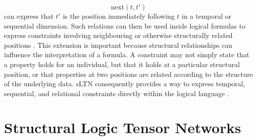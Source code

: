 $$
\mathrm{next}(t,t')
$$
\noindent
can express that $t'$ is the position immediately following $t$ in a temporal or sequential dimension. Such relations can then be used inside logical formulas to express constraints involving neighbouring or otherwise structurally related positions \cite{rinaldi2026sltn}.
This extension is important because structural relationships can influence the interpretation of a formula. A constraint may not simply state that a property holds for an individual, but that it holds at a particular structural position, or that properties at two positions are related according to the structure of the underlying data. sLTN consequently provides a way to express temporal, sequential, and relational constraints directly within the logical language \cite{rinaldi2026sltn}.

\section{Structural Logic Tensor Networks}

\label{sec:SLTN}


